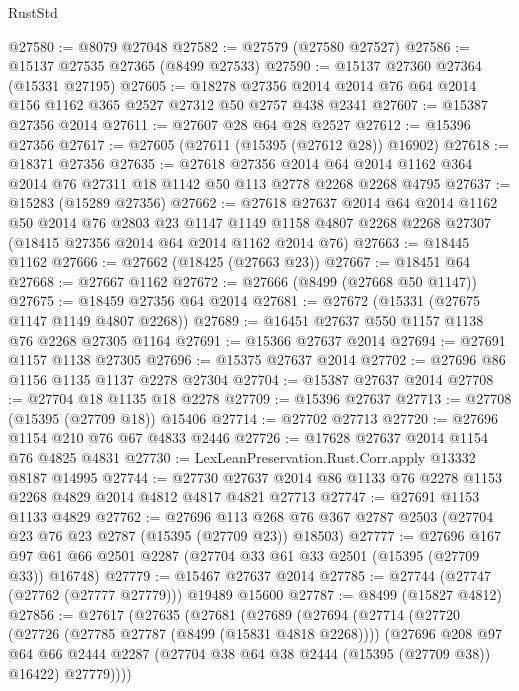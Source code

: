\begin{lexlean}{RustStd}
\begin{coremodule}
@27580 := @8079 @27048
@27582 := @27579 (@27580 @27527)
@27586 := @15137 @27535 @27365 (@8499 @27533)
@27590 := @15137 @27360 @27364 (@15331 @27195)
@27605 := @18278 @27356 @2014 @2014 @76 @64 @2014 @156 @1162 @365 @2527 @27312 @50 @2757 @438 @2341
@27607 := @15387 @27356 @2014
@27611 := @27607 @28 @64 @28 @2527
@27612 := @15396 @27356
@27617 := @27605 (@27611 (@15395 (@27612 @28)) @16902)
@27618 := @18371 @27356
@27635 := @27618
    @27356
    @2014
    @64
    @2014
    @1162
    @364
    @2014
    @76
    @27311
    @18
    @1142
    @50
    @113
    @2778
    @2268
    @2268
    @4795
@27637 := @15283 (@15289 @27356)
@27662 := @27618
    @27637
    @2014
    @64
    @2014
    @1162
    @50
    @2014
    @76
    @2803
    @23
    @1147
    @1149
    @1158
    @4807
    @2268
    @2268
    @27307
    (@18415 @27356 @2014 @64 @2014 @1162 @2014 @76)
@27663 := @18445 @1162
@27666 := @27662 (@18425 (@27663 @23))
@27667 := @18451 @64
@27668 := @27667 @1162
@27672 := @27666 (@8499 (@27668 @50 @1147))
@27675 := @18459 @27356 @64 @2014
@27681 := @27672 (@15331 (@27675 @1147 @1149 @4807 @2268))
@27689 := @16451 @27637 @550 @1157 @1138 @76 @2268 @27305 @1164
@27691 := @15366 @27637 @2014
@27694 := @27691 @1157 @1138 @27305
@27696 := @15375 @27637 @2014
@27702 := @27696 @86 @1156 @1135 @1137 @2278 @27304
@27704 := @15387 @27637 @2014
@27708 := @27704 @18 @1135 @18 @2278
@27709 := @15396 @27637
@27713 := @27708 (@15395 (@27709 @18)) @15406
@27714 := @27702 @27713
@27720 := @27696 @1154 @210 @76 @67 @4833 @2446
@27726 := @17628 @27637 @2014 @1154 @76 @4825 @4831
@27730 := LexLeanPreservation.Rust.Corr.apply @13332 @8187 @14995
@27744 := @27730 @27637 @2014 @86 @1133 @76 @2278 @1153 @2268 @4829 @2014 @4812 @4817 @4821 @27713
@27747 := @27691 @1153 @1133 @4829
@27762 := @27696
    @113
    @268
    @76
    @367
    @2787
    @2503
    (@27704 @23 @76 @23 @2787 (@15395 (@27709 @23)) @18503)
@27777 := @27696
    @167
    @97
    @61
    @66
    @2501
    @2287
    (@27704 @33 @61 @33 @2501 (@15395 (@27709 @33)) @16748)
@27779 := @15467 @27637 @2014
@27785 := @27744 (@27747 (@27762 (@27777 @27779))) @19489 @15600
@27787 := @8499 (@15827 @4812)
@27856 := @27617
    (@27635
      (@27681
        (@27689
          (@27694
            (@27714
              (@27720
                (@27726 (@27785 @27787 (@8499 (@15831 @4818 @2268))))
                (@27696
                  @208
                  @97
                  @64
                  @66
                  @2444
                  @2287
                  (@27704 @38 @64 @38 @2444 (@15395 (@27709 @38)) @16422)
                  @27779))))

\end{coremodule}
\end{lexlean}
